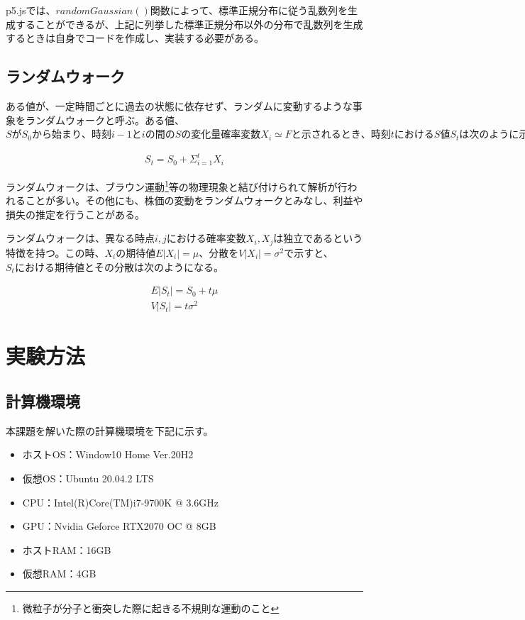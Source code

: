 \documentclass[dvipdfmx]{jsarticle}
\begin{document}
p5.jsでは、$randomGaussian()$関数によって、標準正規分布に従う乱数列を生成することができるが、上記に列挙した標準正規分布以外の分布で乱数列を生成するときは自身でコードを作成し、実装する必要がある。
\subsection{ランダムウォーク}
ある値が、一定時間ごとに過去の状態に依存せず、ランダムに変動するような事象をランダムウォークと呼ぶ。ある値、$SがS_{0}から始まり、時刻i-1とiの間のSの変化量確率変数X_{i}\simeq Fと示されるとき、時刻tにおけるS値S_{t}は次のように示すことができる。$
\begin{center}
  \begin{align*}
    S_{t} = S_{0} + \Sigma_{i=1}^{t}X_{i}
  \end{align*}
\end{center}
ランダムウォークは、ブラウン運動\footnote{微粒子が分子と衝突した際に起きる不規則な運動のこと}等の物理現象と結び付けられて解析が行われることが多い。その他にも、株価の変動をランダムウォークとみなし、利益や損失の推定を行うことがある。

ランダムウォークは、異なる時点$i, j$における確率変数$X_{i}, X_{j}$は独立であるという特徴を持つ。この時、$X_{i}の期待値E|X_{i}| = \mu 、分散をV|X_{i}| = \sigma^{2}$で示すと、$S_{t}における期待値とその分散は次のようになる$。
\begin{center}
  \begin{align*}
    E|S_{t}| = S_{0} + t\mu \\
    V|S_{t}| = t\sigma^{2}
  \end{align*}
\end{center}
\section{実験方法}
\subsection{計算機環境}
本課題を解いた際の計算機環境を下記に示す。
\begin{itemize}
  \item ホストOS：Window10 Home Ver.20H2
  \item 仮想OS：Ubuntu 20.04.2 LTS
  \item CPU：Intel(R)Core(TM)i7-9700K @ 3.6GHz
  \item GPU：Nvidia Geforce RTX2070 OC @ 8GB
  \item ホストRAM：16GB
  \item 仮想RAM：4GB
\end{itemize}
\end{document}
